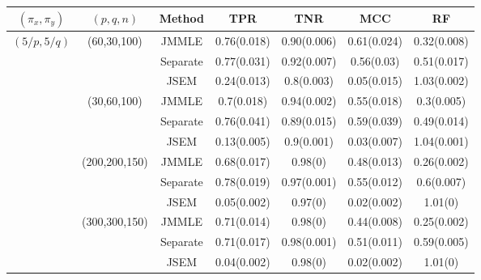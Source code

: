 \begin{scriptsize}
\begin{table}
    \begin{tabular}{ccccccc}
    \hline
    $(\pi_x, \pi_y)$ & $(p,q,n)$   & Method   & TPR            & TNR             & MCC & RF            \\ \hline
    $(5/p, 5/q)$   & (60,30,100)   & JMMLE    & 0.76(0.018) & 0.90(0.006)  & 0.61(0.024)  & 0.32(0.008) \\
    ~              & ~             & Separate & 0.77(0.031) & 0.92(0.007)  & 0.56(0.03)   & 0.51(0.017) \\
    ~              & ~             & JSEM     & 0.24(0.013) & 0.8(0.003)   & 0.05(0.015)  & 1.03(0.002)\\\cline{2-7}
    ~              & (30,60,100)   & JMMLE    & 0.7(0.018)  & 0.94(0.002)  & 0.55(0.018)  & 0.3(0.005) \\
    ~              & ~             & Separate & 0.76(0.041) & 0.89(0.015)  & 0.59(0.039)  & 0.49(0.014) \\
    ~              & ~             & JSEM     & 0.13(0.005) & 0.9(0.001)   & 0.03(0.007)  & 1.04(0.001) \\\cline{2-7}
    ~              & (200,200,150) & JMMLE    & 0.68(0.017) & 0.98(0)      & 0.48(0.013)  & 0.26(0.002) \\
    ~              & ~             & Separate & 0.78(0.019) & 0.97(0.001)  & 0.55(0.012)  & 0.6(0.007) \\
    ~              & ~             & JSEM     & 0.05(0.002) & 0.97(0)      & 0.02(0.002)  & 1.01(0) \\\cline{2-7}
    ~              & (300,300,150) & JMMLE    & 0.71(0.014) & 0.98(0)      & 0.44(0.008)  & 0.25(0.002) \\
    ~              & ~             & Separate & 0.71(0.017) & 0.98(0.001)  & 0.51(0.011)  & 0.59(0.005) \\
    ~              & ~             & JSEM     & 0.04(0.002) & 0.98(0)      & 0.02(0.002)  & 1.01(0)     \\\hline

\end{tabular}
\end{table}
\end{scriptsize}
